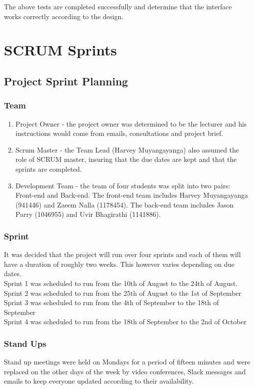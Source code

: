 \documentclass{article}
\begin{document}
The above tests are completed successfully and determine that the interface works correctly according to the design.

\section{SCRUM Sprints}

\subsection{Project Sprint Planning}
\subsubsection{Team}

\begin{enumerate}
\item Project Owner - the project owner was determined to be the lecturer and his instructions
would come from emails, consultations and project brief.
\item Scrum Master - the Team Lead (Harvey Muyangayanga) also assumed the role of SCRUM
master, insuring that the due dates are kept and that the sprints are completed.
\item Development Team - the team of four students was split into two pairs: Front-end and Back-end.
The front-end team includes Harvey Muyangayanga (941446) and Zaeem Nalla (1178454). The back-end team includes Jason Parry (1046955) and Uvir Bhagirathi (1141886).
\end{enumerate}

\subsubsection{Sprint}
It was decided that the project will run over four sprints and each of them will have a duration of roughly two weeks. This however varies depending on due dates.\\
Sprint 1 was scheduled to run from the 10th of August to the 24th of August.\\
Sprint 2 was scheduled to run from the 25th of August to the 1st of September\\
Sprint 3 was scheduled to run from the 4th of September to the 18th of September\\
Sprint 4 was scheduled to run from the 18th of September to the 2nd of October\\

\subsubsection{Stand Ups}
Stand up meetings were held on Mondays for a period of fifteen minutes and were replaced on the other days of the week by video conferences, Slack messages and emails to keep everyone updated according to their availability.
\end{document}
